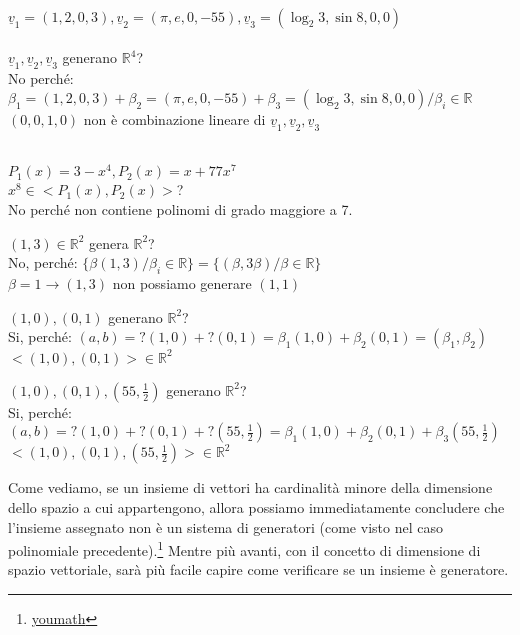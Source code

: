 \begin{es}
	\phantom{}\\
	$\underline{v}_1=(1,2,0,3),\underline{v}_2=(\pi,e,0,-55),\underline{v}_3=(\log_2 3,\sin 8,0,0)$\\\\
	$\underline{v}_1,\underline{v}_2,\underline{v}_3$ generano $\mathbb{R}^4$?\\
	No perché: $\beta_1=(1,2,0,3)+\beta_2=(\pi,e,0,-55)+\beta_3=(\log_2 3,\sin 8,0,0)/\beta_i\in\mathbb{R}$\\
	$(0,0,1,0)$ non è combinazione lineare di $\underline{v}_1,\underline{v}_2,\underline{v}_3$\\\\
\end{es}
\begin{es}
	$P_1(x)=3-x^4, P_2(x)=x+77x^7$\\
	$x^8\in<P_1(x),P_2(x)>$?\\
	No perché non contiene polinomi di grado maggiore a 7.
\end{es}
\begin{es}
	$(1,3)\in\mathbb{R}^2$ genera $\mathbb{R}^2$?\\
	No, perché: $\{\beta(1,3)/\beta_i\in\mathbb{R}\}=\{(\beta,3\beta)/\beta\in\mathbb{R}\}$\\
	$\beta=1\rightarrow(1,3)$ non possiamo generare $(1,1)$
\end{es}
\begin{es}
	$(1,0),(0,1)$ generano $\mathbb{R}^2$?\\
	Si, perché: $(a,b)=?(1,0)+?(0,1)=\beta_1(1,0)+\beta_2(0,1)=(\beta_1,\beta_2)$\\
	$<(1,0),(0,1)>\in\mathbb{R}^2$
\end{es}
\begin{es}
	$(1,0),(0,1),(55,\frac{1}{2})$ generano $\mathbb{R}^2$?\\
	Si, perché: $(a,b)=?(1,0)+?(0,1)+?(55,\frac{1}{2})=\beta_1(1,0)+\beta_2(0,1)+\beta_3(55,\frac{1}{2})$\\
	$<(1,0),(0,1),(55,\frac{1}{2})>\in\mathbb{R}^2$
\end{es}

Come vediamo, se un insieme di vettori ha cardinalità minore della dimensione dello spazio a cui appartengono, allora possiamo immediatamente concludere che l'insieme assegnato non è un sistema di generatori (come visto nel caso polinomiale precedente).\footnote{\href{https://www.youmath.it/lezioni/algebra-lineare/matrici-e-vettori/678-sistema-di-generatori-di-uno-spazio-vettoriale.html}{youmath}} Mentre più avanti, con il concetto di dimensione di spazio vettoriale, sarà più facile capire come verificare se un insieme è generatore.

